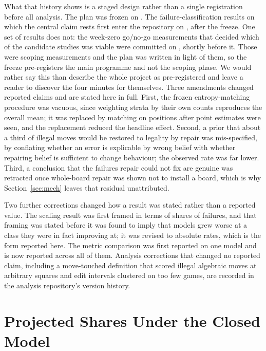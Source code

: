 \documentclass[11pt]{article}
\newif\ifanon
\begin{document}
What that history shows is a staged design rather than a single registration before
all analysis. The plan was frozen on . The failure-classification
results on which the central claim rests first enter the repository on
, after the freeze. One set of results does not: the week-zero
go/no-go measurements that decided which of the candidate studies was viable were
committed on , shortly before it. Those were scoping measurements
and the plan was written in light of them, so the freeze pre-registers the main
programme and not the scoping phase. We would rather say this than describe the whole
project as pre-registered and leave a reader to discover the four minutes for
themselves.
Three amendments changed reported claims and are stated here in full. First, the
frozen entropy-matching procedure was vacuous, since weighting strata by their own
counts reproduces the overall mean; it was replaced by matching on positions after
point estimates were seen, and the replacement reduced the headline effect. Second,
a prior that about a third of illegal moves would be restored to legality by repair
was mis-specified, by conflating whether an error is explicable by wrong belief with
whether repairing belief is sufficient to change behaviour; the observed rate was
far lower. Third, a conclusion that the failures repair could not fix are genuine
was retracted once whole-board repair was shown not to install a board, which is
why Section~\ref{sec:mech} leaves that residual unattributed.

Two further corrections changed how a result was stated rather than a reported
value. The scaling result was first framed in terms of shares of failures, and that
framing was stated before it was found to imply that models grew worse at a class
they were in fact improving at; it was revised to absolute rates, which is the form
reported here. The metric comparison was first reported on one model and is now
reported across all of them. Analysis corrections that changed no reported claim,
including a move-touched definition that scored illegal algebraic moves at
arbitrary squares and edit intervals clustered on too few games, are recorded in the
analysis repository's version history.

\ifanon\else\nocite{rathore2026coherent}\fi



\section{Projected Shares Under the Closed Model}
\label{app:proj}
\end{document}
